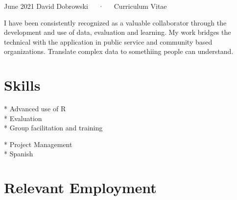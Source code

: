 \documentclass[11pt, a4paper]{awesome-cv}
\begin{document}
\makecvheader

\makecvfooter
  {June 2021}
    {David Dobrowski~~~·~~~Curriculum Vitae}
  {\thepage}





I have been consistently recognized as a valuable collaborator through
the development and use of data, evaluation and learning. My work
bridges the technical with the application in public service and
community based organizations. Translate complex data to somethiing
people can understand.

\hypertarget{skills}{%
\section{Skills}\label{skills}}

\begin{minipage}[t]{0.5\textwidth}
 * Advanced use of R \\
 * Evaluation \\
 * Group facilitation and training \\
\end{minipage}
\begin{minipage}[t]{0.5\textwidth}
 * Project Management \\
 * Spanish \\
\end{minipage}

\hypertarget{relevant-employment}{%
\section{Relevant Employment}\label{relevant-employment}}

\footnotesize
\end{document}
